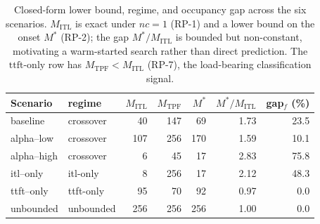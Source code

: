 \begin{table}[t]
  \centering
  \caption{Closed-form lower bound, regime, and occupancy gap across the six scenarios. $M_{\mathrm{ITL}}$ is exact under $nc=1$ (RP-1) and a lower bound on the onset $M^*$ (RP-2); the gap $M^*/M_{\mathrm{ITL}}$ is bounded but non-constant, motivating a warm-started search rather than direct prediction. The $\mathrm{ttft\text{-}only}$ row has $M_{\mathrm{TPF}}<M_{\mathrm{ITL}}$ (RP-7), the load-bearing classification signal.}
  \label{tab:lower-bound-regime}
  \begin{tabular}{llrrrrr}
    \toprule
    Scenario & regime & $M_{\mathrm{ITL}}$ & $M_{\mathrm{TPF}}$ & $M^*$ & $M^*/M_{\mathrm{ITL}}$ & gap$_f$ (\%) \\
    \midrule
    baseline & crossover & 40 & 147 & 69 & 1.73 & 23.5 \\
    alpha--low & crossover & 107 & 256 & 170 & 1.59 & 10.1 \\
    alpha--high & crossover & 6 & 45 & 17 & 2.83 & 75.8 \\
    itl--only & itl-only & 8 & 256 & 17 & 2.12 & 48.3 \\
    ttft--only & ttft-only & 95 & 70 & 92 & 0.97 & 0.0 \\
    unbounded & unbounded & 256 & 256 & 256 & 1.00 & 0.0 \\
    \bottomrule
  \end{tabular}
\end{table}
